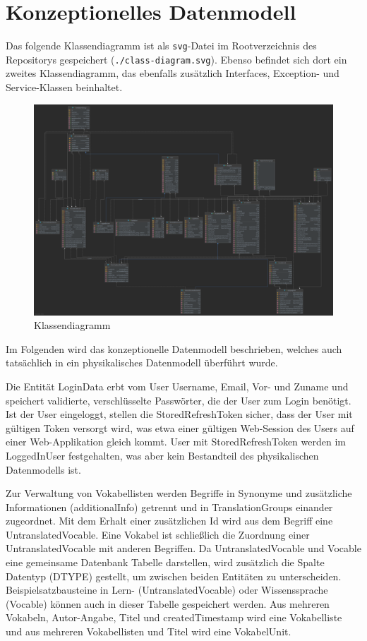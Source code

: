 \section{Konzeptionelles Datenmodell}\label{sec:konzeptionelles-datenmodell}

Das folgende Klassendiagramm ist als \texttt{svg}-Datei im Rootverzeichnis des Repositorys gespeichert (\texttt{./class-diagram.svg}).
Ebenso befindet sich dort ein zweites Klassendiagramm, das ebenfalls zusätzlich Interfaces, Exception- und Service-Klassen beinhaltet.

\begin{figure}[H]
    \centering
    \includegraphics[width=1\textwidth]{class-diagram}
    \caption[]{Klassendiagramm}
    \label{fig:classes}
\end{figure}

Im Folgenden wird das konzeptionelle Datenmodell beschrieben, welches auch tatsächlich in ein physikalisches Datenmodell überführt wurde.

Die Entität LoginData erbt vom User Username, Email, Vor- und Zuname und speichert validierte, verschlüsselte Passwörter, die der User zum Login benötigt.
Ist der User eingeloggt, stellen die StoredRefreshToken sicher, dass der User mit gültigen Token versorgt wird, was etwa
einer gültigen Web-Session des Users auf einer Web-Applikation gleich kommt.
User mit StoredRefreshToken werden im LoggedInUser festgehalten, was aber kein Bestandteil des physikalischen Datenmodells ist.

Zur Verwaltung von Vokabellisten werden Begriffe in Synonyme und zusätzliche Informationen (additionalInfo) getrennt und in TranslationGroups einander zugeordnet.
Mit dem Erhalt einer zusätzlichen Id wird aus dem Begriff eine UntranslatedVocable.
Eine Vokabel ist schließlich die Zuordnung einer UntranslatedVocable mit anderen Begriffen.
Da UntranslatedVocable und Vocable eine gemeinsame Datenbank Tabelle darstellen,
wird zusätzlich die Spalte Datentyp (DTYPE) gestellt, um zwischen beiden Entitäten zu unterscheiden.
Beispielsatzbausteine in Lern- (UntranslatedVocable) oder Wissenssprache (Vocable) können auch in dieser Tabelle gespeichert werden.
Aus mehreren Vokabeln, Autor-Angabe, Titel und createdTimestamp wird eine Vokabelliste und aus mehreren Vokabellisten und Titel
wird eine VokabelUnit.

